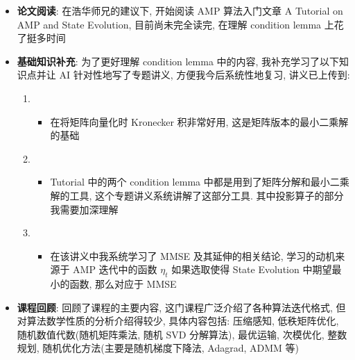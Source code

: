 \documentclass[12pt,a4paper]{article}
\begin{document}
\begin{itemize}
    \item \textbf{论文阅读}: 在浩华师兄的建议下, 开始阅读 AMP 算法入门文章 A Tutorial on AMP and State Evolution, 目前尚未完全读完, 在理解 condition lemma 上花了挺多时间
    \item \textbf{基础知识补充}: 为了更好理解 condition lemma 中的内容, 我补充学习了以下知识点并让 AI 针对性地写了专题讲义, 方便我今后系统性地复习, 
    讲义已上传到:
    \begin{enumerate}
        \item {}
        \begin{itemize}
            \item 在将矩阵向量化时 Kronecker 积非常好用, 这是矩阵版本的最小二乘解的基础
        \end{itemize}
        \item {}
        \begin{itemize}
            \item Tutorial 中的两个 condition lemma 中都是用到了矩阵分解和最小二乘解的工具, 这个专题讲义系统讲解了这部分工具. 其中投影算子的部分我需要加深理解
        \end{itemize}
        \item {}
        \begin{itemize}
            \item 在该讲义中我系统学习了 MMSE 及其延伸的相关结论, 学习的动机来源于 AMP 迭代中的函数 $\eta_t$ 如果选取使得 State Evolution 中期望最小的函数, 那么对应于 MMSE
        \end{itemize}
    \end{enumerate}
    \item \textbf{课程回顾}: 回顾了课程的主要内容, 这门课程广泛介绍了各种算法迭代格式, 但对算法数学性质的分析介绍得较少, 具体内容包括: 压缩感知, 低秩矩阵优化, 随机数值代数(随机矩阵乘法, 随机 SVD 分解算法), 最优运输, 次模优化, 整数规划, 随机优化方法(主要是随机梯度下降法, Adagrad, ADMM 等)

\end{itemize}
\end{document}
